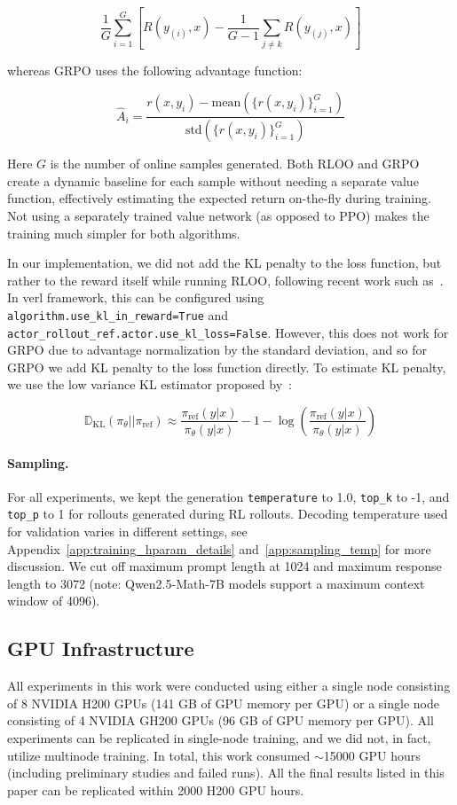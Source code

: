 $$\frac{1}{G}\sum_{i=1}^{G}[R(y_{(i)},x) - \frac{1}{G-1}\sum_{j\neq k}R(y_{(j)},x)]$$

whereas GRPO uses the following advantage function:

$$\hat{A}_i = \frac{
    r(x, y_i) - \text{mean}\left( \{ r(x, y_i) \}_{i=1}^G \right)
}{
    \text{std}\left( \{ r(x, y_i) \}_{i=1}^G \right)
}$$


Here $G$ is the number of online samples generated. Both RLOO and GRPO create a dynamic baseline for each sample without needing a separate value function, effectively estimating the expected return on-the-fly during training. Not using a separately trained value network (as opposed to PPO) makes the training much simpler for both algorithms. 


In our implementation, we did not add the KL penalty to the loss function, but rather to the reward itself while running RLOO, following recent work such as~\citet{tang2025pitfallskldivergencegradient}. In verl framework, this can be configured using \texttt{algorithm.use\_kl\_in\_reward=True} and \texttt{actor\_rollout\_ref.actor.use\_kl\_loss=False}. However, this does not work for GRPO due to advantage normalization by the standard deviation, and so for GRPO we add KL penalty to the loss function directly. To estimate KL penalty, we use the low variance KL estimator proposed by~\citet{schulman2020klapprox}:

$$\mathbb{D}_{\text{KL}}(\pi_\theta || \pi_\text{ref}) \approx \frac{\pi_\text{ref} (y | x)}{\pi_\theta (y|x)} - 1 - \log \left( \frac{\pi_\text{ref} (y | x)}{\pi_\theta (y|x)}\right)$$

\paragraph{Sampling.} For all experiments, we kept the generation \texttt{temperature} to 1.0, \texttt{top\_k} to -1, and \texttt{top\_p} to 1 for rollouts generated during RL rollouts. Decoding temperature used for validation varies in different settings, see Appendix~\ref{app:training_hparam_details} and~\ref{app:sampling_temp} for more discussion. We cut off maximum prompt length at 1024 and maximum response length to 3072 (note: Qwen2.5-Math-7B models support a maximum context window of 4096). 

\subsection{GPU Infrastructure}
All experiments in this work were conducted using either a single node consisting of 8 NVIDIA H200 GPUs (141 GB of GPU memory per GPU) or a single node consisting of 4 NVIDIA GH200 GPUs (96 GB of GPU memory per GPU). All experiments can be replicated in single-node training, and we did not, in fact, utilize multinode training. In total, this work consumed $\sim$15000 GPU hours (including preliminary studies and failed runs). All the final results listed in this paper can be replicated within 2000 H200 GPU hours.


